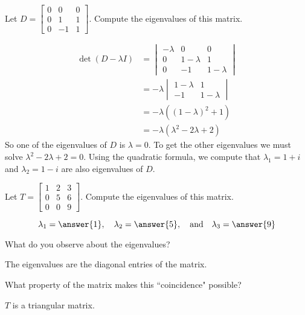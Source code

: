 \documentclass{ximera}
\begin{document}
\begin{example}\label{ex:3x3_complex_eig}
Let $D=\begin{bmatrix} 0&0&0\\ 0 &1&1\\ 0 & -1&1\end{bmatrix}$.  Compute the eigenvalues of this matrix.

\begin{explanation}
\begin{align*}\det(D-\lambda I)&=\begin{vmatrix} -\lambda&0&0\\ 0 &1-\lambda&1\\ 0 & -1&1-\lambda\end{vmatrix}\\
&=-\lambda\begin{vmatrix}1-\lambda&1\\-1&1-\lambda\end{vmatrix}\\
&=-\lambda((1-\lambda)^2+1)\\
&=-\lambda(\lambda^2-2\lambda+2)
\end{align*}
So one of the eigenvalues of $D$ is $\lambda=0$.  To get the other eigenvalues we must solve $\lambda^2-2\lambda+2=0$.  Using the quadratic formula, we compute that $\lambda_1=1+i$ and $\lambda_2=1-i$ are also eigenvalues of $D$.
\end{explanation}
\end{example}

\begin{exploration}\label{init:3x3tri}
Let $T=\begin{bmatrix} 1 & 2 & 3\\ 0 & 5 & 6\\ 0 & 0 & 9\end{bmatrix}$.  Compute the eigenvalues of this matrix.

$$\lambda_1=\answer{1},\quad\lambda_2=\answer{5},\quad\text{and}\quad\lambda_3=\answer{9}$$

What do you observe about the eigenvalues?
\begin{hint}
The eigenvalues are the diagonal entries of the matrix.
\end{hint}

What property of the matrix makes this ``coincidence" possible?

\begin{hint}
$T$ is a triangular matrix.
\end{hint}
\end{exploration}
\end{document}
